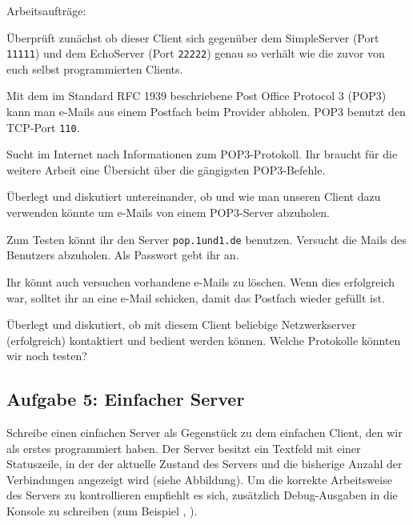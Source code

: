 Arbeitsaufträge:

\begin{compactenum}
\item Überprüft zunächst ob dieser Client sich gegenüber dem SimpleServer (Port
\lstinline|11111|) und dem EchoServer (Port \lstinline|22222|) genau so verhält
wie die zuvor von euch selbst programmierten Clients.

\item Mit dem im Standard RFC 1939 beschriebene Post Office Protocol 3 (POP3)
kann man e-Mails aus einem Postfach beim Provider abholen. POP3 benutzt den
TCP-Port \lstinline|110|.

\begin{compactenum}[a)]
\item Sucht im Internet nach Informationen zum POP3-Protokoll. Ihr braucht für
die weitere Arbeit eine Übersicht über die gängigsten POP3-Befehle.
\item  Überlegt und diskutiert untereinander, ob und wie man unseren Client dazu
verwenden könnte um e-Mails von einem POP3-Server abzuholen.
\end{compactenum}
 
\item Zum Testen könnt ihr den Server \lstinline|pop.1und1.de| benutzen.
Versucht die Mails des Benutzers\linebreak 
{} abzuholen.
Als Passwort gebt ihr  an.

\item Ihr könnt auch versuchen vorhandene e-Mails zu löschen. Wenn dies
erfolgreich war, solltet ihr an  eine
e-Mail schicken, damit das Postfach wieder gefüllt ist.

\item Überlegt und diskutiert, ob mit diesem Client beliebige
Netzwerkserver (erfolgreich) kontaktiert und bedient werden können. Welche
Protokolle könnten wir noch testen?
\end{compactenum}


\subsection{Aufgabe 5: Einfacher Server}

Schreibe einen einfachen Server als Gegenstück zu dem einfachen Client, den wir
als erstes programmiert haben. Der Server besitzt ein Textfeld mit einer
Statuszeile, in der der aktuelle Zustand des Servers und die bisherige Anzahl
der Verbindungen angezeigt wird (siehe Abbildung). Um die korrekte Arbeitsweise
des Servers zu kontrollieren empfiehlt es sich, zusätzlich Debug-Ausgaben in
die Konsole zu schreiben (zum Beispiel ,
).

